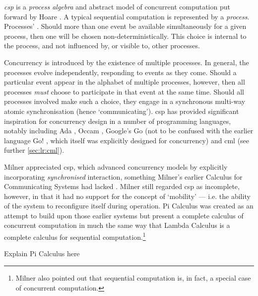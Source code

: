 \emph{\Gls{csp}} is a \emph{process algebra} and abstract model of concurrent computation put forward by Hoare \cite{Hoare1985,Roscoe2011}.  A typical sequential computation is represented by a \emph{process}.  Processes' .  Should more than one event be available simultaneously for a given process, then one will be chosen non-deterministically.  This choice is internal to the process, and not influenced by, or visible to, other processes.

Concurrency is introduced by the existence of multiple processes.  In general, the processes evolve independently, responding to events as they come.  Should a particular event appear in the alphabet of multiple processes, however, then all processes \emph{must} choose to participate in that event at the same time.  Should all processes involved make such a choice, they engage in a synchronous multi-way atomic synchronisation (hence `communicating').  \gls{csp} has provided significant inspiration for concurrency design in a number of programming languages, notably including Ada \cite{Defense1983,Taft2013}, Occam \cite{Elizabeth1987}, Google's Go \cite{Meyerson2014} (not to be confused with the earlier language Go! \cite{Clark2004}, which itself was explicitly designed for concurrency) and \gls{cml} \cite{Reppy2011} (see further \cref{sec:lr:cml}). 

Milner appreciated \gls{csp}, which advanced concurrency models by explicitly incorporating \emph{synchronised} interaction, something Milner's earlier Calculus for Communicating Systems \cite{Milner1980} had lacked  \cite{Milner1993}.  Milner still regarded \gls{csp} as incomplete, however, in that it had no support for the concept of `mobility' --- i.e. the ability of the system to reconfigure itself during operation.  Pi Calculus was created as an attempt to build upon those earlier systems but present a complete calculus of concurrent computation in much the same way that Lambda Calculus \cite{Barendregt1984} is a complete calculus for sequential computation.\footnote{Milner also pointed out that sequential computation is, in fact, a special case of concurrent computation.}

\begin{anfxerror}
Explain Pi Calculus here
\end{anfxerror}


